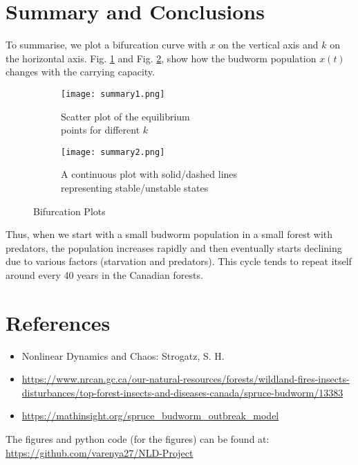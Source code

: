 \documentclass{article}
\begin{document}
\section{Summary and Conclusions}
To summarise, we plot a bifurcation curve with $x$ on the vertical axis and $k$ on the horizontal axis. Fig. \ref{fig:s1} and Fig. \ref{fig:s2}, show how the budworm population $x(t)$ changes with the carrying capacity.
 \begin{figure}[H]
     \centering
     \begin{subfigure}[b]{0.4\textwidth}
         \centering
         \texttt{[image: summary1.png]}
         \caption{Scatter plot of the equilibrium\\ points for different $k$}
         \label{fig:s1}
     \end{subfigure}
     \begin{subfigure}[b]{0.4\textwidth}
         \centering
         \texttt{[image: summary2.png]}
         \caption{A continuous plot with solid/dashed lines\\ representing stable/unstable states }
         \label{fig:s2}
     \end{subfigure}
             \caption{Bifurcation Plots}
        \label{fig:summary}
        \end{figure}
Thus, when we start with a small budworm population in a small forest with predators, the population increases rapidly and then eventually starts declining due to various factors (starvation and predators). This cycle tends to repeat itself around every 40 years in the Canadian forests.
\section{References}
\begin{itemize}
    \item Nonlinear Dynamics and Chaos: Strogatz, S. H.
    \item \url{https://www.nrcan.gc.ca/our-natural-resources/forests/wildland-fires-insects-disturbances/top-forest-insects-and-diseases-canada/spruce-budworm/13383}
    \item \url{https://mathinsight.org/spruce_budworm_outbreak_model}
\end{itemize}
The figures and python code (for the figures) can be found at: \url{https://github.com/varenya27/NLD-Project}
\end{document}
